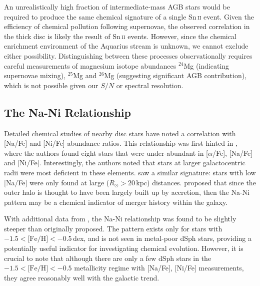 \documentclass{emulateapj}
\begin{document}
An unrealistically high fraction of intermediate-mass AGB stars would be required to produce the same chemical signature of a single {Sn\,\textsc{ii}} event. Given the efficiency of chemical pollution following supernovae, the observed correlation in the thick disc is likely the result of {Sn\,\textsc{ii}} events. However, since the chemical enrichment environment of the Aquarius stream is unknown, we cannot exclude either possibility. Distinguishing between these processes observationally requires careful measurements of magnesium isotope abundances $^{24}$Mg (indicating supernovae mixing), $^{25}$Mg and $^{26}$Mg (suggesting significant AGB contribution), which is not possible given our $S/N$ or spectral resolution.

\subsection{The Na-Ni Relationship}
\label{sec:na-ni-relationship}

Detailed chemical studies of nearby disc stars have noted a correlation with [Na/Fe] and [Ni/Fe] abundance ratios. This relationship was first hinted in \citet{nissen;schuster_1997}, where the authors found eight stars that were under-abundant in [$\alpha$/Fe], [Na/Fe] and [Ni/Fe]. Interestingly, the authors noted that stars at larger galactocentric radii were most deficient in these elements. \citet{fulbright_2000} saw a similar signature: stars with low [Na/Fe] were only found at large {($R_\odot > 20$\,kpc)} distances. \citet{nissen;schuster_1997} proposed that since the outer halo is thought to have been largely built up by accretion, then the {Na-Ni} pattern may be a chemical indicator of merger history within the galaxy.

With additional data from \citet{nissen;schuster_2011}, the {Na-Ni} relationship was found to be slightly steeper than originally proposed. The pattern exists only for stars with {$-1.5 < \mbox{[Fe/H]} < -0.5$\,dex}, and is not seen in metal-poor dSph stars, providing a potentially useful indicator for investigating chemical evolution. However, it is crucial to note that although there are only a few dSph stars in the $-1.5 < \mbox{[Fe/H]} < -0.5$ metallicity regime with [Na/Fe], [Ni/Fe] measurements, they agree reasonably well with the galactic trend. 
\end{document}

